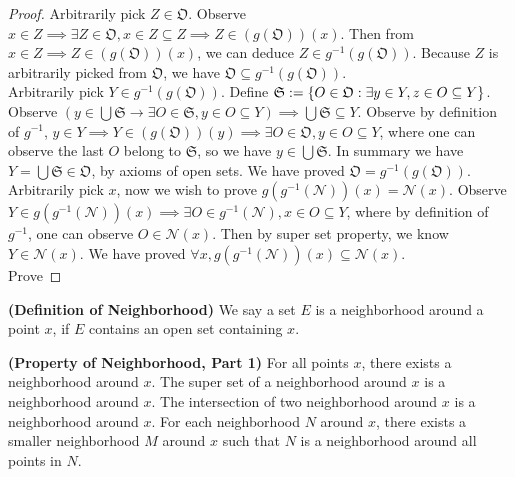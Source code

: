 \documentclass{report}
\begin{document}
\begin{proof}
Arbitrarily pick $Z\in \mathfrak{O}$. Observe $x\in Z \implies \exists Z\in \mathfrak{O},x \in Z\subseteq Z\implies Z\in (g(\mathfrak{O}))(x)$. Then from $x\in Z\implies Z\in (g(\mathfrak{O}))(x)$, we can deduce $Z\in g^{-1}(g(\mathfrak{O}))$. Because $Z$ is arbitrarily picked from  $\mathfrak{O}$, we have $\mathfrak{O}\subseteq g^{-1}(g(\mathfrak{O}))$.\\

Arbitrarily pick $Y \in g^{-1}(g(\mathfrak{O}))$. Define $\mathfrak{S}:=\{ O \in\mathfrak{O}: \exists y \in Y, z \in O \subseteq Y \}$. Observe $(y\in \bigcup \mathfrak{S}\longrightarrow \exists O\in \mathfrak{S},y \in O \subseteq Y)\implies \bigcup \mathfrak{S}\subseteq Y$. Observe  by definition of $g^{-1}$, $y \in Y\implies Y \in (g(\mathfrak{O}))(y)\implies \exists O\in\mathfrak{O}, y \in O\subseteq Y$, where one can observe the last $O$ belong to  $\mathfrak{S}$, so we have $y\in \bigcup \mathfrak{S}$. In summary we have $Y= \bigcup \mathfrak{S}\in \mathfrak{O}$, by axioms of open sets. We have proved $\mathfrak{O}=g^{-1}(g(\mathfrak{O}))$.\\

Arbitrarily pick $x$, now we wish to prove  $g(g^{-1}(\mathcal{N}))(x)=\mathcal{N}(x)$. Observe $Y \in g(g^{-1}(\mathcal{N}))(x)\implies \exists O \in g^{-1}(\mathcal{N}),x \in O \subseteq Y$, where by definition of $g^{-1}$, one can observe $O\in \mathcal{N}(x)$. Then by super set property, we know $Y \in \mathcal{N}(x)$. We have proved $\forall x, g(g^{-1}(\mathcal{N}))(x)\subseteq \mathcal{N}(x)$.\\

Prove 
\end{proof}
\begin{definition}
\label{2.5.6}
\textbf{(Definition of Neighborhood)} We say a set $E$ is a neighborhood around a point $x$, if  $E$ contains an  open set containing $x$.
\end{definition}
\begin{corollary}
\label{2.5.7}
\textbf{(Property of Neighborhood, Part 1)} For all points $x$, there exists a neighborhood around $x$. The super set of a neighborhood around  $x$ is a neighborhood around $x$. The intersection of two neighborhood around  $x$ is a neighborhood around $x$. For each neighborhood $N$ around $x$, there exists a smaller neighborhood $M$ around $x$ such that  $N$ is a neighborhood around all points in $N$.

\end{corollary}
\end{document}
